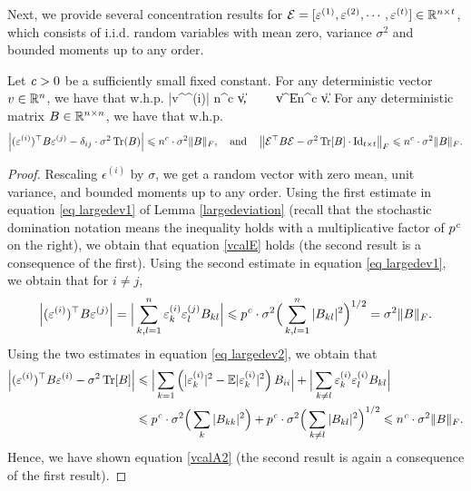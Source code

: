 Next, we provide several concentration results for $\mathcal E=[\varepsilon^{(1)},\varepsilon^{(2)},\cdots, \varepsilon^{(t)}]\in \mathbb{R}^{n\times t}$, which consists of i.i.d. random variables with mean zero, variance $\sigma^2$ and bounded moments up to any order.
 
\begin{corollary}\label{cor_calE}
Let ${\mathit{c}}>0$ be a sufficiently small fixed constant.
For any deterministic vector $v\in \mathbb{R}^n$, we have that w.h.p.
\be\label{vcalE}
	|v^\top \epsilon^{(i)}| \le n^{c} \cdot \sigma \|v\|, \ \ \ \ \|v^\top \cal E\| \le n^{c} \cdot \sigma  \|v\|.
\ee
For any deterministic matrix $B \in \mathbb{R}^{n\times n}$, we have that w.h.p.
\begin{align}\label{vcalA2}
	\left|(\varepsilon^{(i)})^\top B \varepsilon^{(j)} - \delta_{ij}\cdot \sigma^2 \operatorname{Tr}(B)\right| \leqslant n^{c}\cdot \sigma^2 \|B\|_F,  \ \ \text{ and }\ \
	\left\| \mathcal E^\top B \mathcal E - \sigma^2 \operatorname{Tr}[B]\cdot \operatorname{Id}_{t\times t}\right\|_F \leqslant n^{c} \cdot  \sigma^2\|B\|_F.
\end{align}
\end{corollary}
\begin{proof}
Rescaling $\epsilon^{(i)}$ by $\sigma$, we get a random vector with zero mean, unit variance, and bounded moments up to any order.
Using the first estimate in equation \eqref{eq largedev1} of Lemma \ref{largedeviation} (recall that the stochastic domination notation means the inequality holds with a multiplicative factor of $p^{{\mathit{c}}}$ on the right), we obtain that equation \eqref{vcalE} holds (the second result is a consequence of the first).
Using the second estimate in equation \eqref{eq largedev1}, we obtain that for $i\ne j$,
 \begin{align*}
\left|(\varepsilon^{(i)})^\top B \varepsilon^{(j)}\right| = \Big|\sum_{k,l=1}^n \varepsilon^{(i)}_k\varepsilon^{(j)}_l B_{kl} \Big| \leqslant p^{{\mathit{c}}} \cdot \sigma^2 \Big(\sum_{k,l=1}^n|B_{kl}|^2\Big)^{1/2}=\sigma^2 \|B\|_F.
 \end{align*}
Using the two estimates in equation \eqref{eq largedev2}, we obtain that 
\begin{align*}
\left|(\varepsilon^{(i)})^\top B \varepsilon^{(i)} - \sigma^2 \operatorname{Tr}[B]\right| &\leqslant \Big| \sum_{k=1} \left(|\varepsilon^{(i)}_k|^2-\mathbb{E}|\varepsilon^{(i)}_k|^2\right)B_{ii} \Big|+\Big| \sum_{ k\ne l } \varepsilon^{(i)}_k \varepsilon^{(i)}_l B_{kl} \Big| \\
&\leqslant p^{{\mathit{c}}}\cdot \sigma^2 \Big( \sum_{k}|B_{kk}|^2\Big)+ p^{{\mathit{c}}}\cdot \sigma^2 \Big( \sum_{k\ne l}|B_{kl}|^2\Big)^{1/2}\leqslant n^{{\mathit{c}}}\cdot\sigma^2 \|B\|_F.
\end{align*}
Hence, we have shown equation \eqref{vcalA2} (the second result is again a consequence of the first result).
\end{proof}
